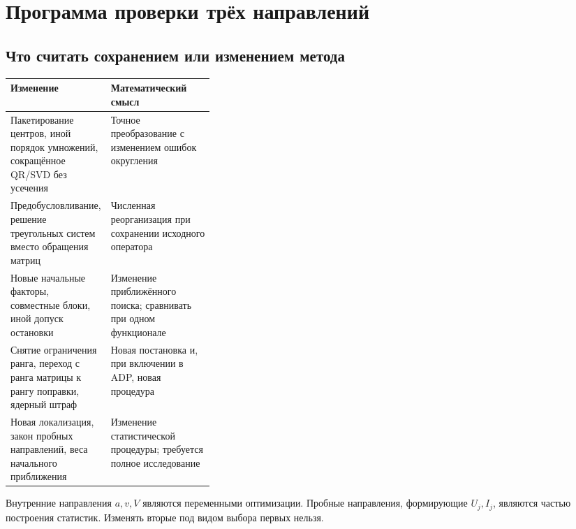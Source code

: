 \documentclass[11pt,a4paper]{article}
\numberwithin{equation}{section}
\theoremstyle{remark}
\begin{document}
\section{Программа проверки трёх направлений}\label{sec:verification}

\subsection{Что считать сохранением или изменением метода}
\begin{center}
\begin{tabularx}{\linewidth}{@{}>{\raggedright\arraybackslash}p{0.34\linewidth}
 >{\raggedright\arraybackslash}X@{}}
\toprule
Изменение & Математический смысл\\
\midrule
Пакетирование центров, иной порядок умножений, сокращённое QR/SVD
без усечения & Точное преобразование с изменением ошибок округления\\
Предобусловливание, решение треугольных систем вместо обращения
матриц & Численная реорганизация при сохранении исходного оператора\\
Новые начальные факторы, совместные блоки, иной допуск остановки
 & Изменение приближённого поиска; сравнивать при одном функционале\\
Снятие ограничения ранга, переход с ранга матрицы к рангу поправки,
ядерный штраф & Новая постановка и, при включении в ADP, новая процедура\\
Новая локализация, закон пробных направлений, веса начального приближения
 & Изменение статистической процедуры; требуется полное исследование\\
\bottomrule
\end{tabularx}
\end{center}
Внутренние направления $a,v,V$ являются переменными оптимизации.
Пробные направления, формирующие $U_j,I_j$, являются частью построения
статистик. Изменять вторые под видом выбора первых нельзя.
\end{document}
